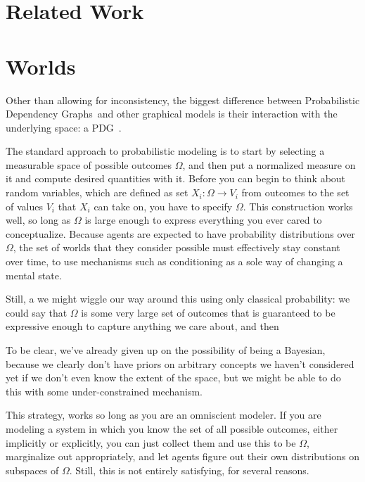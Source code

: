 \documentclass{article}
\newcommand{\modelnames}{Probabilistic Dependency Graphs}
\newcommand{\MN}{PDG}
\begin{document}
	\section{Related Work}

	\section{Worlds}
	Other than allowing for inconsistency, the biggest difference between \modelnames\ and other graphical models is their interaction with the underlying space: a \MN\ .
	
	The standard approach to probabilistic modeling is to start by selecting a measurable space of possible outcomes $\Omega$, and then put a normalized measure on it and compute desired quantities with it. Before you can begin to think about random variables, which are defined as set $X_i : \Omega \to V_i$ from outcomes to the set of values $V_i$ that $X_i$ can take on, you have to specify $\Omega$. This construction works well, so long as $\Omega$ is large enough to express everything you ever cared to conceptualize. Because agents are expected to have probability distributions over $\Omega$, the set of worlds that they consider possible must effectively stay constant over time, to use mechanisms such as conditioning as a sole way of changing a mental state.

	Still, a we might wiggle our way around this using only classical probability: we could say that $\Omega$ is some very large set of outcomes that is guaranteed to be expressive enough to capture anything we care about, and then

	To be clear, we've already given up on the possibility of being a Bayesian, because we clearly don't have priors on arbitrary concepts we haven't considered yet if we don't even know the extent of the space, but we might be able to do this with some under-constrained mechanism.

	This strategy, works so long as you are an omniscient modeler. If you are modeling a system in which you know the set of all possible outcomes, either implicitly or explicitly, you can just collect them and use this to be $\Omega$, marginalize out appropriately, and let agents figure out their own distributions on subspaces of $\Omega$. Still, this is not entirely satisfying, for several reasons.
\end{document}
